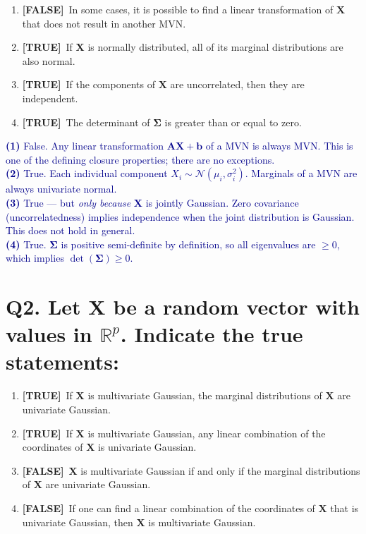 \documentclass[12pt, a4paper]{article}
\newcommand{\T}{\textcolor{truegreen}{\textbf{[TRUE]}}}
\newcommand{\F}{\textcolor{falsered}{\textbf{[FALSE]}}}
\newcommand{\expl}[1]{\textcolor{darkblue}{\small #1}}
\begin{document}
\begin{enumerate}[label=(\arabic*)]
  \item \F\ In some cases, it is possible to find a linear transformation of $\mathbf{X}$ that does not result in another MVN.
  \item \T\ If $\mathbf{X}$ is normally distributed, all of its marginal distributions are also normal.
  \item \T\ If the components of $\mathbf{X}$ are uncorrelated, then they are independent.
  \item \T\ The determinant of $\boldsymbol{\Sigma}$ is greater than or equal to zero.
\end{enumerate}

\expl{
\textbf{(1)} False. Any linear transformation $\mathbf{A}\mathbf{X} + \mathbf{b}$ of a MVN is always MVN. This is one of the defining closure properties; there are no exceptions.\\
\textbf{(2)} True. Each individual component $X_i \sim \mathcal{N}(\mu_i, \sigma_i^2)$. Marginals of a MVN are always univariate normal.\\
\textbf{(3)} True --- but \textit{only because} $\mathbf{X}$ is jointly Gaussian. Zero covariance (uncorrelatedness) implies independence when the joint distribution is Gaussian. This does not hold in general.\\
\textbf{(4)} True. $\boldsymbol{\Sigma}$ is positive semi-definite by definition, so all eigenvalues are $\geq 0$, which implies $\det(\boldsymbol{\Sigma}) \geq 0$.
}

\vspace{1.5em}

\section*{Q2. Let $\mathbf{X}$ be a random vector with values in $\mathbb{R}^p$. Indicate the true statements:}

\begin{enumerate}[label=(\arabic*)]
  \item \T\ If $\mathbf{X}$ is multivariate Gaussian, the marginal distributions of $\mathbf{X}$ are univariate Gaussian.
  \item \T\ If $\mathbf{X}$ is multivariate Gaussian, any linear combination of the coordinates of $\mathbf{X}$ is univariate Gaussian.
  \item \F\ $\mathbf{X}$ is multivariate Gaussian if and only if the marginal distributions of $\mathbf{X}$ are univariate Gaussian.
  \item \F\ If one can find a linear combination of the coordinates of $\mathbf{X}$ that is univariate Gaussian, then $\mathbf{X}$ is multivariate Gaussian.
\end{enumerate}
\end{document}
